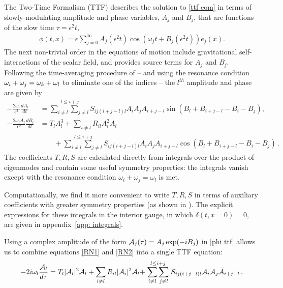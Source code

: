 \documentclass[../PhD.tex]{subfiles}
\begin{document}
The Two-Time Formalism (TTF) describes the solution to \eqref{ttf eom} in terms of slowly-modulating amplitude and phase variables, $A_j$ and $B_j$, that are functions of the slow time $\tau = \epsilon^2 t$,
\begin{align}
\label{phi ttf}
\phi(t,x) = \epsilon \sum_{j=0}^\infty A_j (\epsilon^2 t) \cos \left(\omega_j t + B_j(\epsilon^2 t) \right) e_j(x) .
\end{align}
The next non-trivial order in the equations of motion include gravitational self-interactions of the scalar field, and provides source terms for $A_j$ and $B_j$. Following the time-averaging procedure of \cite{1407.6273} -- and using the resonance condition $\omega_i + \omega_j = \omega_k + \omega_l$ to eliminate one of the indices -- the $l^{th}$ amplitude and phase are given by
\begin{align}
\label{RN1}
-\frac{2\omega_l}{\epsilon^2} \frac{d A_l}{d t} &= \stackrel{l \leq i + j}{\sum_{i \neq l} \sum_{j \neq l}} S_{ij (i + j -l) l} A_i A_j A_{i + j - l} \sin \left( B_l + B_{i+j-l} - B_i - B_j \right) , \\
\label{RN2}
- \frac{2 \omega_l A_l}{\epsilon^2} \frac{d B_l}{dt} &= T_l A_l^3 + \sum_{i \neq l} R_{i l} A^2_i A_l  \nonumber \\
& \qquad + \stackrel{l \leq i + j}{\sum_{i \neq l} \sum_{j \neq l}} S_{ij (i + j -l) l} A_i A_j A_{i + j - l} \cos \left( B_l + B_{i+j-l} - B_i - B_j \right) \, .
\end{align}
The coefficients $T, R, S$ are calculated directly from integrals over the product of eigenmodes and contain some useful symmetry properties: the integrals vanish except with the resonance condition $\omega_i + \omega_j = \omega_l$ is met. 

Computationally, we find it more convenient to write $T, R, S$ in terms of auxiliary coefficients with greater symmetry properties (as shown in \cite{1508.04943}). The explicit expressions for these integrals in the interior gauge, in which $\delta(t,x=0)=0$, are given in appendix~\ref{app: integrals}. 

Using a complex amplitude of the form $\mathcal A_j(\tau) = A_j \exp (-i B_j )$ in \eqref{phi ttf} allows us to combine equations \eqref{RN1} and \eqref{RN2} into a single TTF equation:
\begin{align}
\label{ttf eqn}
-2i \omega_l \frac{\mathcal A_l}{d \tau} = T_l |\mathcal A_l|^2 \mathcal A_l + \sum_{i \neq l} R_{il} |\mathcal A_i|^2 \mathcal A_l + \stackrel{l \leq i+j}{\sum_{i \neq l} \sum_{j \neq l}} S_{ij(i+j-l)l} \mathcal A_i \mathcal A_j \bar{\mathcal A}_{i+j-l} \, .
\end{align}
\end{document}
